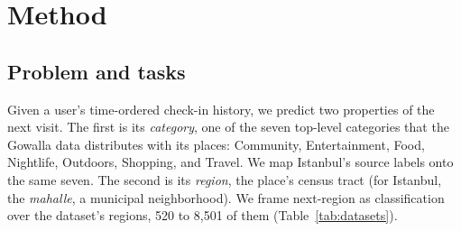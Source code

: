 \section{Method}
\label{sec:method}

\subsection{Problem and tasks}
\label{sec:problem}
Given a user's time-ordered check-in history, we predict two properties of the next visit. The first is its \emph{category}, one of the seven top-level categories that the Gowalla data distributes with its places: Community, Entertainment, Food,
Nightlife, Outdoors, Shopping, and Travel. We map Istanbul's source labels onto the same seven.
The second is its \emph{region}, the place's census tract (for Istanbul, the \emph{mahalle}, a municipal neighborhood). We frame next-region as classification over the dataset's regions, 520 to 8,501 of them (Table~\ref{tab:datasets}).


